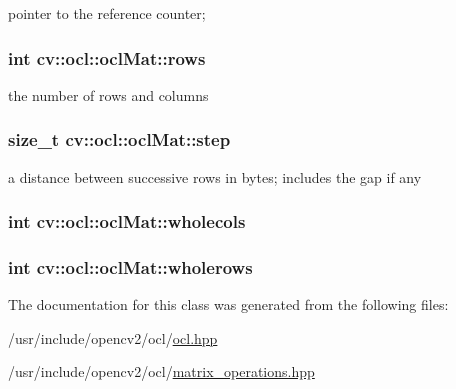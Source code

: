 pointer to the reference counter; 

\hypertarget{classcv_1_1ocl_1_1oclMat_a1ccf0125fff51e419aa89b144ed511be}{
\subsubsection[{rows}]{\setlength{\rightskip}{0pt plus 5cm}int cv\-::ocl\-::ocl\-Mat\-::rows}}\label{classcv_1_1ocl_1_1oclMat_a1ccf0125fff51e419aa89b144ed511be}


the number of rows and columns 

\hypertarget{classcv_1_1ocl_1_1oclMat_a5449adbd0cfb2cd99a84282d5b4ae8fb}{
\subsubsection[{step}]{\setlength{\rightskip}{0pt plus 5cm}size\-\_\-t cv\-::ocl\-::ocl\-Mat\-::step}}\label{classcv_1_1ocl_1_1oclMat_a5449adbd0cfb2cd99a84282d5b4ae8fb}


a distance between successive rows in bytes; includes the gap if any 

\hypertarget{classcv_1_1ocl_1_1oclMat_a14c2fba8e91788465d55af4eb81ee8da}{
\subsubsection[{wholecols}]{\setlength{\rightskip}{0pt plus 5cm}int cv\-::ocl\-::ocl\-Mat\-::wholecols}}\label{classcv_1_1ocl_1_1oclMat_a14c2fba8e91788465d55af4eb81ee8da}
\hypertarget{classcv_1_1ocl_1_1oclMat_a44c93654f3c64228a79a8c626d8ad05e}{
\subsubsection[{wholerows}]{\setlength{\rightskip}{0pt plus 5cm}int cv\-::ocl\-::ocl\-Mat\-::wholerows}}\label{classcv_1_1ocl_1_1oclMat_a44c93654f3c64228a79a8c626d8ad05e}


The documentation for this class was generated from the following files\-:\begin{DoxyCompactItemize}
\item 
/usr/include/opencv2/ocl/\hyperlink{ocl_2ocl_8hpp}{ocl.\-hpp}\item 
/usr/include/opencv2/ocl/\hyperlink{matrix__operations_8hpp}{matrix\-\_\-operations.\-hpp}\end{DoxyCompactItemize}
